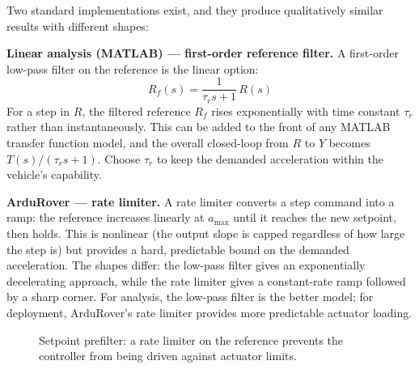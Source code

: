\documentclass[../../book.tex]{subfiles}
\begin{document}
Two standard implementations exist, and they produce qualitatively similar
results with different shapes:

\textbf{Linear analysis (MATLAB) --- first-order reference filter.}
A first-order low-pass filter on the reference is the linear option:
\begin{equation}
  R_f(s) = \frac{1}{\tau_r s + 1}\,R(s)
  \label{eq:reffilter}
\end{equation}
For a step in $R$, the filtered reference $R_f$ rises exponentially with
time constant $\tau_r$ rather than instantaneously.  This can be added to
the front of any MATLAB transfer function model, and the overall closed-loop
from $R$ to $Y$ becomes $T(s)/(\tau_r s + 1)$.  Choose $\tau_r$ to keep
the demanded acceleration within the vehicle's capability.

\textbf{ArduRover --- rate limiter.}
A rate limiter converts a step command into a ramp: the reference increases
linearly at $a_\mathrm{max}$ until it reaches the new setpoint, then holds.
This is nonlinear (the output slope is capped regardless of how large the
step is) but provides a hard, predictable bound on the demanded acceleration.
The shapes differ: the low-pass filter gives an exponentially decelerating
approach, while the rate limiter gives a constant-rate ramp followed by
a sharp corner.  For analysis, the low-pass filter is the better model; for
deployment, ArduRover's rate limiter provides more predictable actuator
loading.

\begin{figure}[htbp]
\centering
{}
\caption{Setpoint prefilter: a rate limiter on the reference prevents the
  controller from being driven against actuator limits.}
\label{fig:prefilter}
\end{figure}
\end{document}
